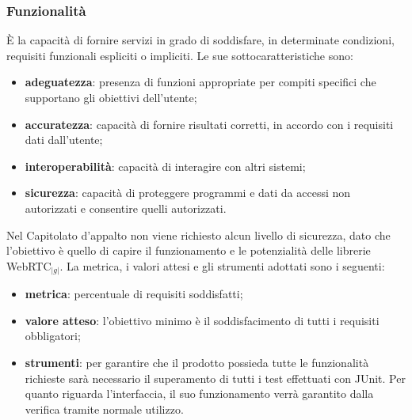 {	\subsubsection{Funzionalità}{
	    \`E la capacità di fornire servizi in grado di soddisfare, in determinate condizioni, requisiti funzionali espliciti o impliciti. Le sue sottocaratteristiche sono:
	    \begin{itemize}
		\item \textbf{adeguatezza}: presenza di funzioni appropriate per compiti specifici che supportano gli obiettivi dell’utente;
		\item \textbf{accuratezza}: capacità di fornire risultati corretti, in accordo con i requisiti dati dall’utente;
		\item \textbf{interoperabilità}: capacità di interagire con altri sistemi;
		\item \textbf{sicurezza}: capacità di proteggere programmi e dati da accessi non autorizzati e consentire quelli autorizzati.\\
	    \end{itemize}
	    Nel Capitolato d'appalto non viene richiesto alcun livello di sicurezza, dato che l'obiettivo è quello di capire il funzionamento e le potenzialità delle librerie WebRTC$_{|g|}$.
	    La metrica, i valori attesi e gli strumenti adottati sono i seguenti:
	    \begin{itemize}
		\item \textbf{metrica}: percentuale di requisiti soddisfatti;
		\item \textbf{valore atteso}: l’obiettivo minimo è il soddisfacimento di tutti i requisiti obbligatori;
		\item \textbf{strumenti}: per garantire che il prodotto possieda tutte le funzionalità richieste sarà necessario il superamento di tutti i test effettuati con JUnit. Per quanto riguarda l'interfaccia, il suo funzionamento verrà garantito dalla verifica tramite normale utilizzo.
	    \end{itemize}
	}
}
